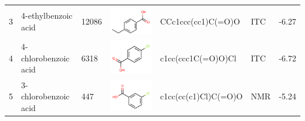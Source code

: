 \documentclass[aps,pre,twocolumn,nofootinbib,superscriptaddress,10pt, final,tightenlines]{revtex4-1}
\begin{document}
\begin{table}
\begin{tabular}{lllp{2cm}>{\ttfamily}llS[table-format=-1.2, table-figures-uncertainty=1]}
3            & 4-ethylbenzoic acid                      & 12086            & \parbox[c]{1em}{\includegraphics[scale=0.2]{figures/12086.pdf}} & CCc1ccc(cc1)C(=O)O            & ITC    & -6.27      \\
4            & 4-chlorobenzoic acid                     & 6318             & \parbox[c]{1em}{\includegraphics[scale=0.2]{figures/6318.pdf}}  & c1cc(ccc1C(=O)O)Cl            & ITC    & -6.72      \\
5            & 3-chlorobenzoic acid                     & 447              & \parbox[c]{1em}{\includegraphics[scale=0.2]{figures/447.pdf}}   & c1cc(cc(c1)Cl)C(=O)O          & NMR    &  -5.24     \\

\end{tabular}
\end{table}
\end{document}
